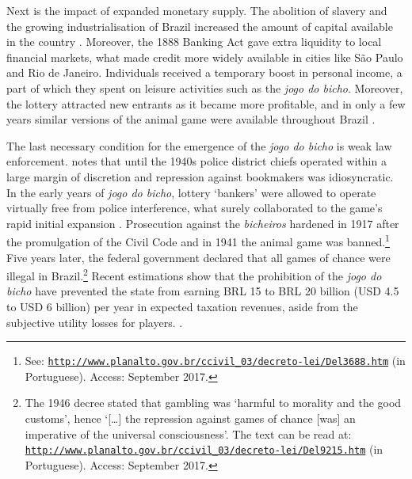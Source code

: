 \documentclass[a4paper,12pt]{article}
\begin{document}
Next is the impact of expanded monetary supply. The abolition of slavery and the growing industrialisation of Brazil increased the amount of capital available in the country \citep{franco1987reformas, schulz2008financial}. Moreover, the 1888 Banking Act gave extra liquidity to local financial markets, what made credit more widely available in cities like São Paulo and Rio de Janeiro. Individuals received a temporary boost in personal income, a part of which they spent on leisure activities such as the \textit{jogo do bicho}. Moreover, the lottery attracted new entrants as it became more profitable, and in only a few years similar versions of the animal game were available throughout Brazil \citep[79]{da1999aguias}.  

The last necessary condition for the emergence of the \textit{jogo do bicho} is weak law enforcement. \citet[69--100]{chazkel2011laws} notes that until the 1940s police district chiefs operated within a large margin of discretion and repression against bookmakers was idiosyncratic. In the early years of \textit{jogo do bicho}, lottery `bankers' were allowed to operate virtually free from police interference, what surely collaborated to the game's rapid initial expansion \citep[544]{chazkel2007beyond}. Prosecution against the \textit{bicheiros} hardened in 1917 after the promulgation of the Civil Code and in 1941 the animal game was banned.\footnote{See: \href{http://www.planalto.gov.br/ccivil_03/decreto-lei/Del3688.htm}{\texttt{http://www.planalto.gov.br/ccivil\_03/decreto-lei/Del3688.htm}} (in Portuguese). Access: September 2017.} Five years later, the federal government declared that all games of chance were illegal in Brazil.\footnote{The 1946 decree stated that gambling was `harmful to morality and the good customs', hence `[\dots] the repression against games of chance [was] an imperative of the universal consciousness'. The text can be read at: \href{http://www.planalto.gov.br/ccivil_03/decreto-lei/Del9215.htm}{\texttt{http://www.planalto.gov.br/ccivil\_03/decreto-lei/Del9215.htm}} (in Portuguese). Access: September 2017.} Recent estimations show that the prohibition of the \textit{jogo do bicho} have prevented the state from earning BRL 15 to BRL 20 billion (USD 4.5 to USD 6 billion) per year in expected taxation revenues, aside from the subjective utility losses for players. \citep{fsp2016legalizarbicho}.
\end{document}
